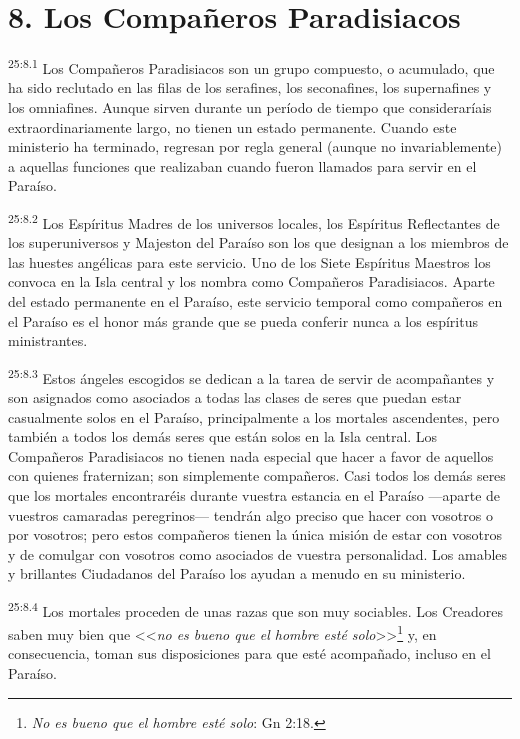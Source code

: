 \section*{8. Los Compañeros Paradisiacos}
\par
\textsuperscript{25:8.1} Los Compañeros Paradisiacos son un grupo compuesto, o acumulado, que ha sido reclutado en las filas de los serafines, los seconafines, los supernafines y los omniafines. Aunque sirven durante un período de tiempo que consideraríais extraordinariamente largo, no tienen un estado permanente. Cuando este ministerio ha terminado, regresan por regla general (aunque no invariablemente) a aquellas funciones que realizaban cuando fueron llamados para servir en el Paraíso.

\par
\textsuperscript{25:8.2} Los Espíritus Madres de los universos locales, los Espíritus Reflectantes de los superuniversos y Majeston del Paraíso son los que designan a los miembros de las huestes angélicas para este servicio. Uno de los Siete Espíritus Maestros los convoca en la Isla central y los nombra como Compañeros Paradisiacos. Aparte del estado permanente en el Paraíso, este servicio temporal como compañeros en el Paraíso es el honor más grande que se pueda conferir nunca a los espíritus ministrantes.

\par
\textsuperscript{25:8.3} Estos ángeles escogidos se dedican a la tarea de servir de acompañantes y son asignados como asociados a todas las clases de seres que puedan estar casualmente solos en el Paraíso, principalmente a los mortales ascendentes, pero también a todos los demás seres que están solos en la Isla central. Los Compañeros Paradisiacos no tienen nada especial que hacer a favor de aquellos con quienes fraternizan; son simplemente compañeros. Casi todos los demás seres que los mortales encontraréis durante vuestra estancia en el Paraíso ---aparte de vuestros camaradas peregrinos--- tendrán algo preciso que hacer con vosotros o por vosotros; pero estos compañeros tienen la única misión de estar con vosotros y de comulgar con vosotros como asociados de vuestra personalidad. Los amables y brillantes Ciudadanos del Paraíso los ayudan a menudo en su ministerio.

\par
\textsuperscript{25:8.4} Los mortales proceden de unas razas que son muy sociables. Los Creadores saben muy bien que <<\textit{no es bueno que el hombre esté solo}>>\footnote{\textit{No es bueno que el hombre esté solo}: Gn 2:18.} y, en consecuencia, toman sus disposiciones para que esté acompañado, incluso en el Paraíso.

